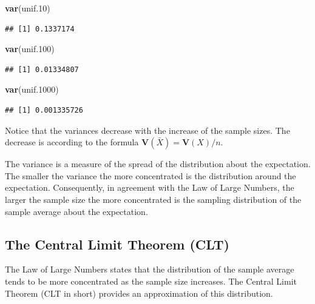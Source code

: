 \documentclass[
]{krantz}
\makeatletter
\newenvironment{Shaded}{\begin{snugshade}}{\end{snugshade}}
\newcommand{\FloatTok}[1]{\textcolor[rgb]{0.00,0.00,0.81}{#1}}
\newcommand{\KeywordTok}[1]{\textcolor[rgb]{0.13,0.29,0.53}{\textbf{#1}}}
\newcommand{\NormalTok}[1]{#1}
\newcommand{\Var}{\mathbf{V}}
\newenvironment{kframe}{%
\medskip{}
\setlength{\fboxsep}{.8em}
 \def\at@end@of@kframe{}%
 \ifinner\ifhmode%
  \def\at@end@of@kframe{\end{minipage}}%
  \begin{minipage}{\columnwidth}%
 \fi\fi%
 \def\FrameCommand##1{\hskip\@totalleftmargin \hskip-\fboxsep
 \colorbox{shadecolor}{##1}\hskip-\fboxsep
     \hskip-\linewidth \hskip-\@totalleftmargin \hskip\columnwidth}%
 \MakeFramed {\advance\hsize-\width
   \@totalleftmargin\z@ \linewidth\hsize
   \@setminipage}}%
 {\par\unskip\endMakeFramed%
 \at@end@of@kframe}
\renewenvironment{Shaded}{\begin{kframe}}{\end{kframe}}
\theoremstyle{definition}
\theoremstyle{definition}
\theoremstyle{definition}
\theoremstyle{remark}
\makeatother
\begin{document}
\begin{Shaded}
\begin{Highlighting}[]
\KeywordTok{var}\NormalTok{(unif}\FloatTok{.10}\NormalTok{)}
\end{Highlighting}
\end{Shaded}

\begin{verbatim}
## [1] 0.1337174
\end{verbatim}

\begin{Shaded}
\begin{Highlighting}[]
\KeywordTok{var}\NormalTok{(unif}\FloatTok{.100}\NormalTok{)}
\end{Highlighting}
\end{Shaded}

\begin{verbatim}
## [1] 0.01334807
\end{verbatim}

\begin{Shaded}
\begin{Highlighting}[]
\KeywordTok{var}\NormalTok{(unif}\FloatTok{.1000}\NormalTok{)}
\end{Highlighting}
\end{Shaded}

\begin{verbatim}
## [1] 0.001335726
\end{verbatim}

Notice that the variances decrease with the increase of the sample
sizes. The decrease is according to the formula
\(\Var(\bar X) = \Var(X)/n\).

The variance is a measure of the spread of the distribution about the
expectation. The smaller the variance the more concentrated is the
distribution around the expectation. Consequently, in agreement with the
Law of Large Numbers, the larger the sample size the more concentrated
is the sampling distribution of the sample average about the
expectation.

\hypertarget{the-central-limit-theorem-clt}{%
\subsection{The Central Limit Theorem (CLT)}\label{the-central-limit-theorem-clt}}

The Law of Large Numbers states that the distribution of the sample
average tends to be more concentrated as the sample size increases. The
Central Limit Theorem (CLT in short) provides an approximation of this
distribution.
\end{document}
